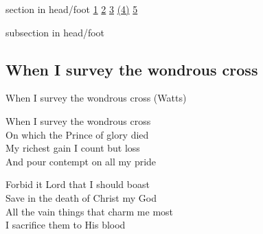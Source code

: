 \documentclass{beamer}
\begin{document}
{
{ 
 {
 \begin{beamercolorbox}[ht=4.5ex,dp=1.5ex,%
      leftskip=.3cm,rightskip=.3cm plus1fil]{section in head/foot}
 \fontsize{12}{25}\selectfont 
\hyperlink{When I survey the wondrous cross[](Watts)1}{1}
\hyperlink{When I survey the wondrous cross[](Watts)2}{2}
\hyperlink{When I survey the wondrous cross[](Watts)3}{3}
\hyperlink{When I survey the wondrous cross[](Watts)(4)}{(4)}
\hyperlink{When I survey the wondrous cross[](Watts)5}{5}
 
 \end{beamercolorbox}%
  \begin{beamercolorbox}[ht=2.5ex,dp=1.125ex,%
   leftskip=.3cm,rightskip=.3cm plus1fil]{subsection in head/foot}
   \insertauthor
 \end{beamercolorbox}%
 }
}
\subsection{ When I survey the wondrous cross }

\hypertarget{When I survey the wondrous cross[](Watts)1}{}
\begin{frame}{When I survey the wondrous cross (Watts)}
\fontsize{ 18 }{ 23 }\selectfont

When I survey the wondrous cross\\ 
On which the Prince of glory died\\ 
My richest gain I count but loss\\ 
And pour contempt on all my pride 

\end{frame}

\hypertarget{When I survey the wondrous cross[](Watts)2}{}
\begin{frame}{}
\fontsize{ 18 }{ 23 }\selectfont

Forbid it Lord that I should boast\\ 
Save in the death of Christ my God\\ 
All the vain things that charm me most\\ 
I sacrifice them to His blood 

\end{frame}

\hypertarget{When I survey the wondrous cross[](Watts)3}{}
\begin{frame}{}
\fontsize{ 18 }{ 23 }\selectfont


\end{frame}}
\end{document}
